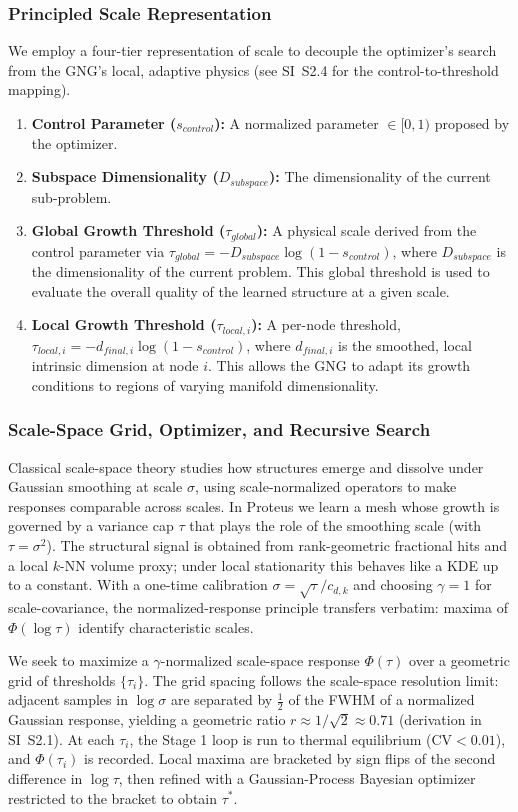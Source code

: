 \documentclass[11pt]{article}
\begin{document}
\subsubsection{Principled Scale Representation}
We employ a four-tier representation of scale to decouple the optimizer's search from the GNG's local, adaptive physics (see SI~S2.4 for the control-to-threshold mapping).
\begin{enumerate}
    \item \textbf{Control Parameter ($s_{control}$):} A normalized parameter $\in [0,1)$ proposed by the optimizer.
    \item \textbf{Subspace Dimensionality ($D_{subspace}$):} The dimensionality of the current sub-problem.
    \item \textbf{Global Growth Threshold ($\tau_{global}$):} A physical scale derived from the control parameter via $\tau_{global} = -D_{subspace} \log(1 - s_{control})$, where $D_{subspace}$ is the dimensionality of the current problem. This global threshold is used to evaluate the overall quality of the learned structure at a given scale.
    \item \textbf{Local Growth Threshold ($\tau_{local,i}$):} A per-node threshold, $\tau_{local,i} = -d_{final,i} \log(1 - s_{control})$, where $d_{final,i}$ is the smoothed, local intrinsic dimension at node $i$. This allows the GNG to adapt its growth conditions to regions of varying manifold dimensionality.
\end{enumerate}

\subsubsection{Scale-Space Grid, Optimizer, and Recursive Search}
Classical scale-space theory studies how structures emerge and dissolve under Gaussian smoothing at scale $\sigma$, using scale-normalized operators to make responses comparable across scales. In Proteus we learn a mesh whose growth is governed by a variance cap $\tau$ that plays the role of the smoothing scale (with $\tau{=}\sigma^2$). The structural signal is obtained from rank-geometric fractional hits and a local $k$-NN volume proxy; under local stationarity this behaves like a KDE up to a constant. With a one-time calibration $\sigma = \sqrt{\tau}/c_{d,k}$ and choosing $\gamma{=}1$ for scale-covariance, the normalized-response principle transfers verbatim: maxima of $\Phi(\log\tau)$ identify characteristic scales.

We seek to maximize a $\gamma$-normalized scale-space response $\Phi(\tau)$ over a geometric grid of thresholds $\{\tau_i\}$. The grid spacing follows the scale-space resolution limit: adjacent samples in $\log\sigma$ are separated by $\tfrac{1}{2}$ of the FWHM of a normalized Gaussian response, yielding a geometric ratio $r \approx 1/\sqrt{2} \approx 0.71$ (derivation in SI~S2.1). At each $\tau_i$, the Stage 1 loop is run to thermal equilibrium (CV$<0.01$), and $\Phi(\tau_i)$ is recorded. Local maxima are bracketed by sign flips of the second difference in $\log\tau$, then refined with a Gaussian-Process Bayesian optimizer restricted to the bracket to obtain $\tau^*$.
\end{document}
